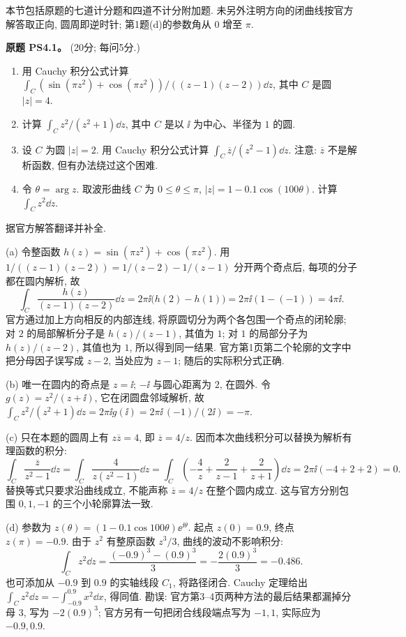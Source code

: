 本节包括原题的七道计分题和四道不计分附加题. 未另外注明方向的闭曲线按官方解答取正向, 圆周即逆时针; 第1题(d)的参数角从 $0$ 增至 $\pi$.

\begin{exercise}\label{ass:ps4-1}
\textbf{原题 PS4.1。} (20分; 每问5分.)
\begin{enumerate}[label=(\alph*)]
\item 用 Cauchy 积分公式计算
$\int_C(\sin(\pi z^2)+\cos(\pi z^2))/((z-1)(z-2))\dd z$,
其中 $C$ 是圆 $|z|=4$.
\item 计算 $\int_Cz^2/(z^2+1)\dd z$, 其中 $C$ 是以 $\ii$ 为中心、半径为 $1$ 的圆.
\item 设 $C$ 为圆 $|z|=2$. 用 Cauchy 积分公式计算
$\int_C\overline z/(z^2-1)\dd z$.
注意: $\overline z$ 不是解析函数, 但有办法绕过这个困难.
\item 令 $\theta=\arg z$. 取波形曲线 $C$ 为
$0\le\theta\le\pi$, $|z|=1-0.1\cos(100\theta)$.
计算 $\int_Cz^2\dd z$.
\end{enumerate}
\end{exercise}
\begin{solution}
据官方解答翻译并补全.

(a) 令整函数 $h(z)=\sin(\pi z^2)+\cos(\pi z^2)$. 用
$1/((z-1)(z-2))=1/(z-2)-1/(z-1)$ 分开两个奇点后, 每项的分子都在圆内解析, 故
\[
 \int_C\frac{h(z)}{(z-1)(z-2)}\dd z
 =2\pi\ii\bigl(h(2)-h(1)\bigr)
 =2\pi\ii(1-(-1))=4\pi\ii.
\]
官方通过加上方向相反的内部连线, 将原圆切分为两个各包围一个奇点的闭轮廓; 对 $2$ 的局部解析分子是 $h(z)/(z-1)$, 其值为 $1$; 对 $1$ 的局部分子为 $h(z)/(z-2)$, 其值也为 $1$, 所以得到同一结果. 官方第1页第二个轮廓的文字中把分母因子误写成 $z-2$, 当处应为 $z-1$; 随后的实际积分式正确.

(b) 唯一在圆内的奇点是 $z=\ii$; $-\ii$ 与圆心距离为 $2$, 在圆外.
令 $g(z)=z^2/(z+\ii)$, 它在闭圆盘邻域解析, 故
$\int_Cz^2/(z^2+1)\dd z=2\pi\ii g(\ii)
=2\pi\ii\,(-1)/(2\ii)=-\pi$.

(c) 只在本题的圆周上有 $z\overline z=4$, 即 $\overline z=4/z$. 因而本次曲线积分可以替换为解析有理函数的积分:
\[
 \int_C\frac{\overline z}{z^2-1}\dd z
 =\int_C\frac4{z(z^2-1)}\dd z
 =\int_C\left(-\frac4z+\frac2{z-1}+\frac2{z+1}\right)\dd z
 =2\pi\ii(-4+2+2)=0.
\]
替换等式只要求沿曲线成立, 不能声称 $\overline z=4/z$ 在整个圆内成立. 这与官方分别包围 $0,1,-1$ 的三个小轮廓算法一致.

(d) 参数为 $z(\theta)=(1-0.1\cos100\theta)\ee^{\ii\theta}$.
起点 $z(0)=0.9$, 终点 $z(\pi)=-0.9$.
由于 $z^2$ 有整原函数 $z^3/3$, 曲线的波动不影响积分:
\[
 \int_Cz^2\dd z
 =\frac{(-0.9)^3-(0.9)^3}{3}
 =-\frac{2(0.9)^3}{3}=-0.486.
\]
也可添加从 $-0.9$ 到 $0.9$ 的实轴线段 $C_1$, 将路径闭合.
Cauchy 定理给出 $\int_Cz^2\dd z=-\int_{-0.9}^{0.9}x^2\dd x$, 得同值.
勘误: 官方第3--4页两种方法的最后结果都漏掉分母 $3$, 写为 $-2(0.9)^3$; 官方另有一句把闭合线段端点写为 $-1,1$, 实际应为 $-0.9,0.9$.
\end{solution}

